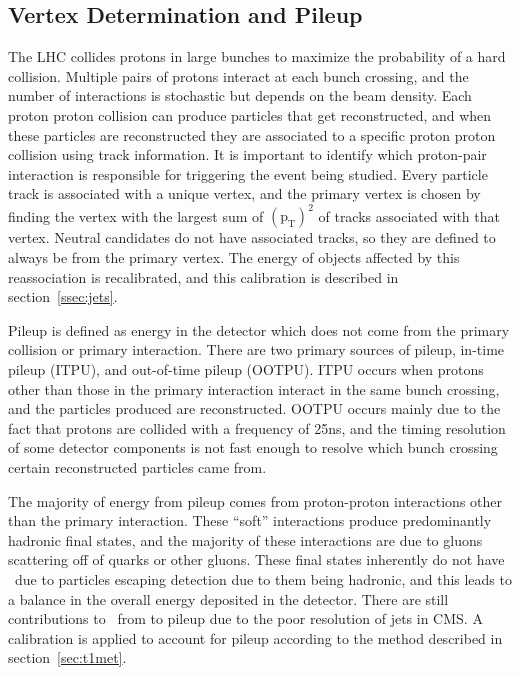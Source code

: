 \subsection{Vertex Determination and Pileup}
\label{ssec:vtxandpileup}
The LHC collides protons in large bunches to maximize the probability of a hard collision.
Multiple pairs of protons interact at each bunch crossing,
and the number of interactions is stochastic but depends on the beam density.
Each proton proton collision can produce particles that get reconstructed,
and when these particles are reconstructed they are associated to a specific proton proton collision using track information.
It is important to identify which proton-pair interaction is responsible for triggering the event being studied.
Every particle track is associated with a unique vertex,
and the primary vertex is chosen by finding the vertex with the largest sum of $\mathrm{(p_{T})^{2}}$ of tracks associated with that vertex.
Neutral candidates do not have associated tracks, so they are defined to always be from the primary vertex.
The energy of objects affected by this reassociation is recalibrated, and this calibration is described in section~\ref{ssec:jets}.

Pileup is defined as energy in the detector which does not come from the primary collision or primary interaction.
There are two primary sources of pileup, in-time pileup (ITPU), and out-of-time pileup (OOTPU).
ITPU occurs when protons other than those in the primary interaction interact in the same bunch crossing,
and the particles produced are reconstructed.
OOTPU occurs mainly due to the fact that protons are collided with a frequency of 25ns,
and the timing resolution of some detector components is not fast enough to resolve which bunch crossing certain reconstructed particles came from.

The majority of energy from pileup comes from proton-proton interactions other than the primary interaction.
These ``soft'' interactions produce predominantly hadronic final states,
and the majority of these interactions are due to gluons scattering off of quarks or other gluons.
These final states inherently do not have \MET\ due to particles escaping detection due to them being hadronic,
and this leads to a balance in the overall energy deposited in the detector.
There are still contributions to \MET\ from to pileup due to the poor resolution of jets in CMS.
A calibration is applied to account for pileup according to the method described in section~\ref{sec:t1met}.



